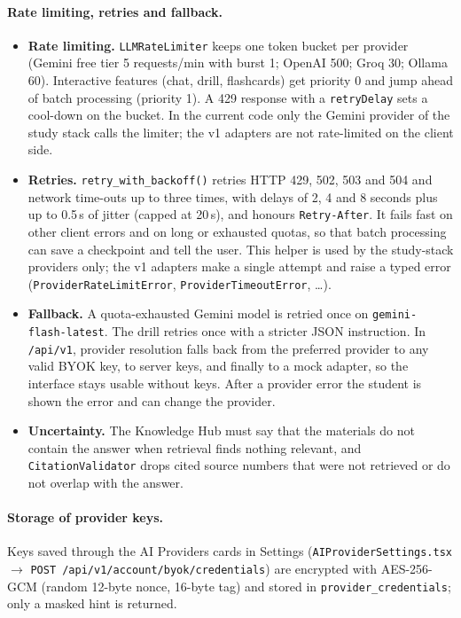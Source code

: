 \paragraph{Rate limiting, retries and fallback.}
\begin{itemize}[leftmargin=*]
  \item \textbf{Rate limiting.} \texttt{LLMRateLimiter} keeps one token bucket per
    provider (Gemini free tier 5 requests/min with burst 1; OpenAI 500; Groq 30; Ollama
    60). Interactive features (chat, drill, flashcards) get priority 0 and jump ahead of
    batch processing (priority 1). A 429 response with a \texttt{retryDelay} sets a
    cool-down on the bucket. In the current code only the Gemini provider of the study
    stack calls the limiter; the v1 adapters are not rate-limited on the client side.
  \item \textbf{Retries.} \texttt{retry\_with\_backoff()} retries HTTP 429, 502, 503 and
    504 and network time-outs up to three times, with delays of 2, 4 and 8 seconds plus
    up to 0.5\,s of jitter (capped at 20\,s), and honours \texttt{Retry-After}. It fails
    fast on other client errors and on long or exhausted quotas, so that batch
    processing can save a checkpoint and tell the user. This helper is used by the
    study-stack providers only; the v1 adapters make a single attempt and raise a typed
    error (\texttt{ProviderRateLimitError}, \texttt{ProviderTimeoutError}, \ldots).
  \item \textbf{Fallback.} A quota-exhausted Gemini model is retried once on
    \texttt{gemini-flash-latest}. The drill retries once with a stricter JSON
    instruction. In \texttt{/api/v1}, provider resolution falls back from the preferred
    provider to any valid BYOK key, to server keys, and finally to a mock adapter, so the
    interface stays usable without keys. After a provider error the student is shown
    the error and can change the provider.
  \item \textbf{Uncertainty.} The Knowledge Hub must say that the materials do not
    contain the answer when retrieval finds nothing relevant, and
    \texttt{CitationValidator} drops cited source numbers that were not retrieved or do
    not overlap with the answer.
\end{itemize}

\paragraph{Storage of provider keys.}
Keys saved through the AI Providers cards in Settings
(\texttt{AIProviderSettings.tsx} $\rightarrow$ \texttt{POST /api/v1/account/byok/credentials})
are encrypted with AES-256-GCM (random 12-byte nonce, 16-byte tag) and stored in
\texttt{provider\_credentials}; only a masked hint is returned.

